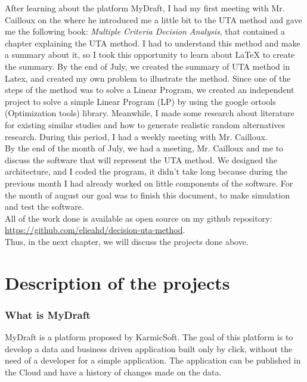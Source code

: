 \documentclass{report}
\begin{document}
After learning about the platform MyDraft, I had my first meeting with Mr. Cailloux on the  where he introduced me a little bit to the UTA method and gave me the following book: \textit{Multiple Criteria Decision Analysis}, that contained a chapter explaining the UTA method. I had to understand this method and make a summary about it, so I took this opportunity to learn about LaTeX to create the summary. By the end of July, we created the summary of UTA method in Latex, and created my own problem to illustrate the method. Since one of the steps of the method was to solve a Linear Program,  we created an independent project to solve a simple Linear Program (LP) by using the google ortools (Optimization tools) library. Meanwhile, I made some research about literature for existing similar studies and how to generate realistic random alternatives research. During this period, I had a weekly meeting with Mr. Cailloux.\\

By the end of the month of July, we had a meeting, Mr. Cailloux and me to discuss the software that will represent the UTA method. We designed the architecture, and I coded the program, it didn't take long because during the previous month I had already worked on little components of the software. For the month of august our goal was to finish this document, to make simulation and test the software.\\ 

All of the work done is available as open source on my github repository: \url{ https://github.com/elieahd/decision-uta-method}.\\

Thus, in the next chapter, we will discuss the projects done above.

\chapter{Description of the projects}
\subsection{What is MyDraft}
MyDraft is a platform proposed by KarmicSoft. The goal of this platform is to develop a data and business driven application built only by click, without the need of a developer for a simple application. The application can be published in the Cloud and have a history of changes made on the data.\\
\end{document}
